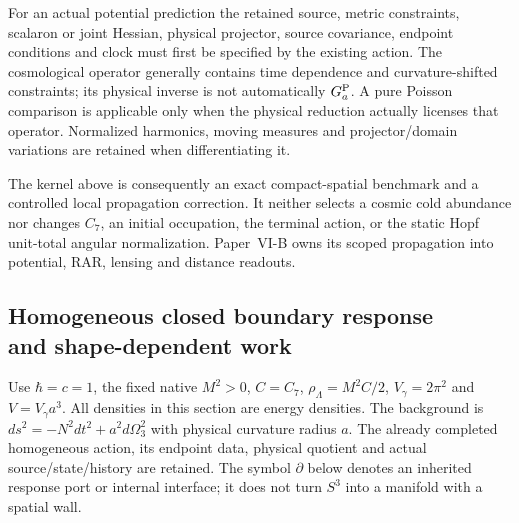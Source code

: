 \documentclass[12pt,a4paper]{article}
\begin{document}
\begin{remark}
\label{p8:rem:v2204-poisson-physical-scope}
For an actual potential prediction the retained source, metric constraints,
scalaron or joint Hessian, physical projector, source covariance, endpoint
conditions and clock must first be specified by the existing action. The
cosmological operator generally contains time dependence and curvature-shifted
constraints; its physical inverse is not automatically $G_a^{\rm P}$.
A pure Poisson comparison is applicable only when the physical reduction
actually licenses that operator. Normalized harmonics, moving measures and
projector/domain variations are retained when differentiating it.

The kernel above is consequently an exact compact-spatial benchmark and a
controlled local propagation correction. It neither selects a cosmic cold
abundance nor changes $C_7$, an initial occupation, the terminal action, or
the static Hopf unit-total angular normalization. Paper~VI-B owns its scoped
propagation into potential, RAR, lensing and distance readouts.
\end{remark}


\subsection[Homogeneous closed boundary response and shape-dependent work]{Homogeneous closed boundary response\\ and shape-dependent work}
\label{p8:sec:v2205-homogeneous-boundary-stress}

Use $\hbar=c=1$, the fixed native $M^2>0$, $C=C_7$,
$\rho_\Lambda=M^2C/2$, $V_\gamma=2\pi^2$ and $V=V_\gamma a^3$.
All densities in this section are energy densities. The background is
$ds^2=-N^2dt^2+a^2d\Omega_3^2$ with physical curvature radius $a$.
The already completed homogeneous action, its endpoint data, physical
quotient and actual source/state/history are retained. The symbol
$\partial$ below denotes an inherited response port or internal interface;
it does not turn $S^3$ into a manifold with a spatial wall.

\end{document}
